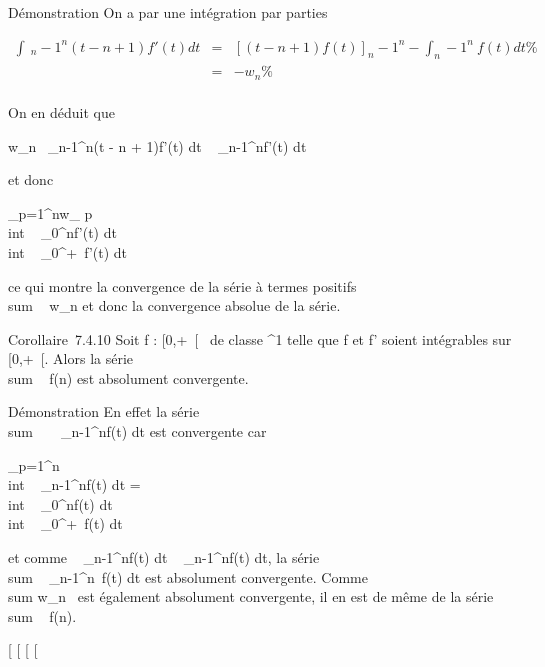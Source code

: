 \documentclass[]{article}
\begin{document}
Démonstration On a par une intégration par parties

\begin{align*} \int ~
_n-1^n(t - n + 1)f'(t) dt& =& \left
[(t - n + 1)f(t)\right ]_ n-1^n
-\int  _n-1^n~f(t) dt\%&
\\ & =& -w_n \%&
\\ \end{align*}

On en déduit que

w_n\leq\int ~
_n-1^n(t - n + 1)f'(t) dt
\leq\int ~
_n-1^nf'(t) dt

et donc

\sum _p=1^nw_
p\leq\\int  ~
_0^nf'(t) dt
\leq\\int  ~
_0^+\infty~f'(t) dt

ce qui montre la convergence de la série à termes positifs
\\sum ~
w_n et donc la convergence absolue de la
série.

Corollaire~7.4.10 Soit f : [0,+\infty~[\rightarrow~  de classe ^1 telle
que f et f' soient intégrables sur [0,+\infty~[. Alors la série
\\sum ~ f(n) est
absolument convergente.

Démonstration En effet la série
\\sum ~
\int ~
_n-1^nf(t) dt est convergente car

\sum _p=1^n~
\\int  ~
_n-1^nf(t) dt =
\\int  ~
_0^nf(t) dt
\leq\\int  ~
_0^+\infty~f(t) dt

et comme \left \int ~
_n-1^nf(t) dt\right
\leq\int ~
_n-1^nf(t) dt, la série
\\sum ~
\int  _n-1^n~f(t) dt est
absolument convergente. Comme
\\sum  w_n~ est
également absolument convergente, il en est de même de la série
\\sum ~ f(n).

[
[
[
[
\end{document}
